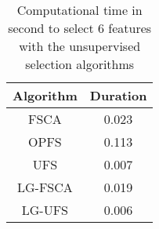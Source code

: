 \begin{table}
	\begin{center}
		\begin{tabular}{c c}
			Algorithm & Duration \\
			\hline
			FSCA & 0.023 \\
			OPFS & 0.113 \\
			UFS & 0.007 \\
			LG-FSCA & 0.019 \\
			LG-UFS & 0.006 \\
		\end{tabular}
	\end{center}
	\caption{Computational time in second to select 6 features with the unsupervised selection algorithms}
\end{table}